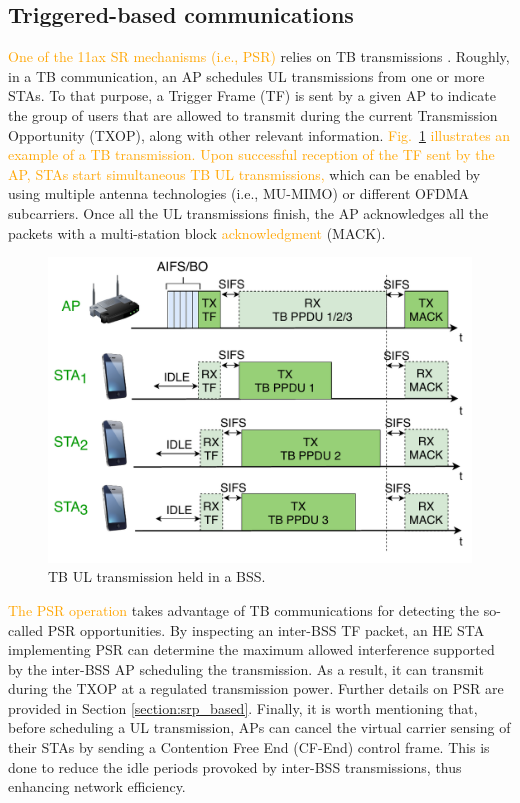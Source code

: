 \documentclass{ieeeaccess}
\begin{document}
\subsection{Triggered-based communications}
\label{section:tb_communication}
\textcolor{orange}{One of the 11ax SR mechanisms (i.e., PSR)} relies on TB transmissions \cite{bellalta2019ap}. Roughly, in a TB communication, an AP schedules UL transmissions from one or more STAs. To that purpose, a Trigger Frame (TF) is sent by a given AP to indicate the group of users that are allowed to transmit during the current Transmission Opportunity (TXOP), along with other relevant information. \textcolor{orange}{Fig.~\ref{fig:TB_transmission_example} illustrates an example of a TB transmission. Upon successful reception of the TF sent by the AP, STAs start simultaneous TB UL transmissions,} which can be enabled by using multiple antenna technologies (i.e., MU-MIMO) or different OFDMA subcarriers. Once all the UL transmissions finish, the AP acknowledges all the packets with a multi-station block \textcolor{orange}{acknowledgment} (MACK).

\begin{figure}[ht!]
	\centering
	\includegraphics[width=.95\columnwidth]{fig_8}
	\caption{TB UL transmission held in a BSS.}
	\label{fig:TB_transmission_example}
\end{figure}

\textcolor{orange}{The PSR operation} takes advantage of TB communications for detecting the so-called PSR opportunities. By inspecting an inter-BSS TF packet, an HE STA implementing PSR can determine the maximum allowed interference supported by the inter-BSS AP scheduling the transmission. As a result, it can transmit during the TXOP at a regulated transmission power. Further details on PSR are provided in Section \ref{section:srp_based}. Finally, it is worth mentioning that, before scheduling a UL transmission, APs can cancel the virtual carrier sensing of their STAs by sending a Contention Free End (CF-End) control frame. This is done to reduce the idle periods provoked by inter-BSS transmissions, thus enhancing network efficiency. 
\end{document}
